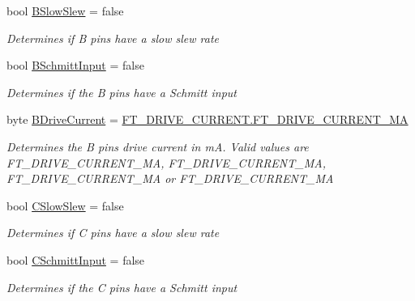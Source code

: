 \begin{DoxyCompactItemize}
bool \mbox{\hyperlink{class_f_t_d2_x_x___n_e_t_1_1_f_t_d_i_1_1_f_t4232_h___e_e_p_r_o_m___s_t_r_u_c_t_u_r_e_a4391ea86543399f6be164e98903f1bc2}{B\+Slow\+Slew}} = false
\begin{DoxyCompactList}\small\item\em Determines if B pins have a slow slew rate \end{DoxyCompactList}\item 
bool \mbox{\hyperlink{class_f_t_d2_x_x___n_e_t_1_1_f_t_d_i_1_1_f_t4232_h___e_e_p_r_o_m___s_t_r_u_c_t_u_r_e_a32fc500139349fdff12e7a1484f30683}{B\+Schmitt\+Input}} = false
\begin{DoxyCompactList}\small\item\em Determines if the B pins have a Schmitt input \end{DoxyCompactList}\item 
byte \mbox{\hyperlink{class_f_t_d2_x_x___n_e_t_1_1_f_t_d_i_1_1_f_t4232_h___e_e_p_r_o_m___s_t_r_u_c_t_u_r_e_a5f16aa531d397c7c8d888035d6361d7c}{B\+Drive\+Current}} = \mbox{\hyperlink{class_f_t_d2_x_x___n_e_t_1_1_f_t_d_i_1_1_f_t___d_r_i_v_e___c_u_r_r_e_n_t_af6b404bcc6f2eb88bbc95b183d5729ea}{F\+T\+\_\+\+D\+R\+I\+V\+E\+\_\+\+C\+U\+R\+R\+E\+N\+T.\+F\+T\+\_\+\+D\+R\+I\+V\+E\+\_\+\+C\+U\+R\+R\+E\+N\+T\+\_\+MA}}
\begin{DoxyCompactList}\small\item\em Determines the B pins drive current in mA. Valid values are F\+T\+\_\+\+D\+R\+I\+V\+E\+\_\+\+C\+U\+R\+R\+E\+N\+T\+\_\+MA, F\+T\+\_\+\+D\+R\+I\+V\+E\+\_\+\+C\+U\+R\+R\+E\+N\+T\+\_\+MA, F\+T\+\_\+\+D\+R\+I\+V\+E\+\_\+\+C\+U\+R\+R\+E\+N\+T\+\_\+MA or F\+T\+\_\+\+D\+R\+I\+V\+E\+\_\+\+C\+U\+R\+R\+E\+N\+T\+\_\+MA \end{DoxyCompactList}\item 
bool \mbox{\hyperlink{class_f_t_d2_x_x___n_e_t_1_1_f_t_d_i_1_1_f_t4232_h___e_e_p_r_o_m___s_t_r_u_c_t_u_r_e_a5046f1407f66847ed2b8653b9019d0ee}{C\+Slow\+Slew}} = false
\begin{DoxyCompactList}\small\item\em Determines if C pins have a slow slew rate \end{DoxyCompactList}\item 
bool \mbox{\hyperlink{class_f_t_d2_x_x___n_e_t_1_1_f_t_d_i_1_1_f_t4232_h___e_e_p_r_o_m___s_t_r_u_c_t_u_r_e_a71e94ad3667c7b6bdc18d10461b306f8}{C\+Schmitt\+Input}} = false
\begin{DoxyCompactList}\small\item\em Determines if the C pins have a Schmitt input \end{DoxyCompactList}\item 

\end{DoxyCompactItemize}
